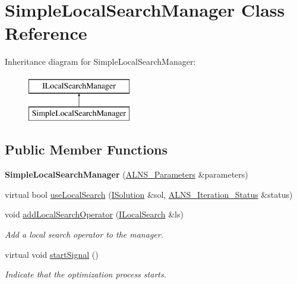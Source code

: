 \hypertarget{classSimpleLocalSearchManager}{\section{\-Simple\-Local\-Search\-Manager \-Class \-Reference}
\label{classSimpleLocalSearchManager}
}
\-Inheritance diagram for \-Simple\-Local\-Search\-Manager\-:\begin{figure}[H]
\begin{center}
\leavevmode
\includegraphics[height=2.000000cm]{classSimpleLocalSearchManager}
\end{center}
\end{figure}
\subsection*{\-Public \-Member \-Functions}
\begin{DoxyCompactItemize}
\item 
\hypertarget{classSimpleLocalSearchManager_a31e41079ea8d2aa1630bbee2f1cbe7fd}{{\bfseries \-Simple\-Local\-Search\-Manager} (\hyperlink{classALNS__Parameters}{\-A\-L\-N\-S\-\_\-\-Parameters} \&parameters)}\label{classSimpleLocalSearchManager_a31e41079ea8d2aa1630bbee2f1cbe7fd}

\item 
virtual bool \hyperlink{classSimpleLocalSearchManager_a213c380b351e4c7c4b4948ad7da513a7}{use\-Local\-Search} (\hyperlink{classISolution}{\-I\-Solution} \&sol, \hyperlink{classALNS__Iteration__Status}{\-A\-L\-N\-S\-\_\-\-Iteration\-\_\-\-Status} \&status)
\item 
\hypertarget{classSimpleLocalSearchManager_acd75ce5f7619a645520b5e1ebe854ee3}{void \hyperlink{classSimpleLocalSearchManager_acd75ce5f7619a645520b5e1ebe854ee3}{add\-Local\-Search\-Operator} (\hyperlink{classILocalSearch}{\-I\-Local\-Search} \&ls)}\label{classSimpleLocalSearchManager_acd75ce5f7619a645520b5e1ebe854ee3}

\begin{DoxyCompactList}\small\item\em \-Add a local search operator to the manager. \end{DoxyCompactList}\item 
\hypertarget{classSimpleLocalSearchManager_abf69f94e9d32260cf5eaed192c42114c}{virtual void \hyperlink{classSimpleLocalSearchManager_abf69f94e9d32260cf5eaed192c42114c}{start\-Signal} ()}\label{classSimpleLocalSearchManager_abf69f94e9d32260cf5eaed192c42114c}

\begin{DoxyCompactList}\small\item\em \-Indicate that the optimization process starts. \end{DoxyCompactList}\end{DoxyCompactItemize}



